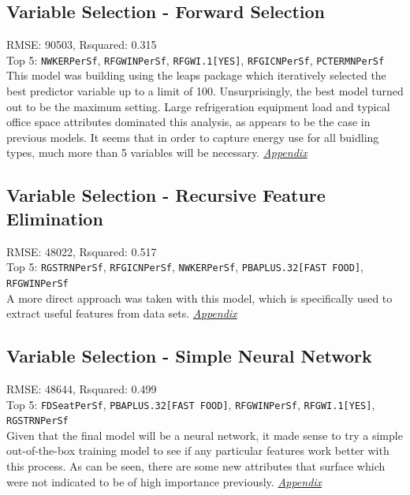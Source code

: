 \subsection{Variable Selection - Forward Selection}
RMSE: 90503, Rsquared: 0.315\\
Top 5: \lstinline{NWKERPerSf}, \lstinline{RFGWINPerSf}, \lstinline{RFGWI.1[YES]}, \lstinline{RFGICNPerSf}, \lstinline{PCTERMNPerSf}
\\[0.1in]
\indent This model was building using the leaps package which iteratively selected the best predictor variable up to a limit of 100.  Unsurprisingly, the best model turned out to be the maximum setting.  Large refrigeration equipment load and typical office space attributes dominated this analysis, as appears to be the case in previous models.  It seems that in order to capture energy use for all buidling types, much more than 5 variables will be necessary.  \textit{\hyperref[appendix:electricity:lp]{Appendix}}

\subsection{Variable Selection - Recursive Feature Elimination}
RMSE: 48022, Rsquared: 0.517\\
Top 5: \lstinline{RGSTRNPerSf}, \lstinline{RFGICNPerSf}, \lstinline{NWKERPerSf}, \lstinline{PBAPLUS.32[FAST FOOD]}, \lstinline{RFGWINPerSf}
\\[0.1in]
\indent A more direct approach was taken with this model, which is specifically used to extract useful features from data sets. \textit{\hyperref[appendix:electricity:rfe]{Appendix}}

\subsection{Variable Selection - Simple Neural Network}
RMSE: 48644, Rsquared: 0.499\\
Top 5: \lstinline{FDSeatPerSf}, \lstinline{PBAPLUS.32[FAST FOOD]}, \lstinline{RFGWINPerSf}, \lstinline{RFGWI.1[YES]}, \lstinline{RGSTRNPerSf}
\\[0.1in]
\indent Given that the final model will be a neural network, it made sense to try a simple out-of-the-box training model to see if any particular features work better with this process.  As can be seen, there are some new attributes that surface which were not indicated to be of high importance previously.  \textit{\hyperref[appendix:electricity:snn]{Appendix}}
\newpage
